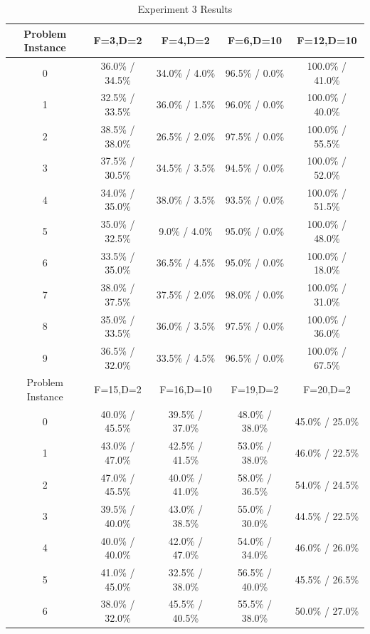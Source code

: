 \documentclass[times,12pt,titlepage]{mstogs}
\begin{document}
\begin{ThesisBody}
\FloatBarrier
\begin{table}[htbp]
	\centering
	\caption{Experiment 3 Results}
	\label{tab:experiment3Results}
	\begin{tabular}{c|c|c|c|c}
		\toprule
		Problem Instance & F=3,D=2 & F=4,D=2 & F=6,D=10 & F=12,D=10\\
		\hline
		0 & 36.0\% / 34.5\% & 34.0\% / 4.0\% & 96.5\% / 0.0\% & 100.0\% / 41.0\%\\
		\hline
		1 & 32.5\% / 33.5\% & 36.0\% / 1.5\% & 96.0\% / 0.0\% & 100.0\% / 40.0\%\\
		\hline
		2 & 38.5\% / 38.0\% & 26.5\% / 2.0\% & 97.5\% / 0.0\% & 100.0\% / 55.5\%\\
		\hline
		3 & 37.5\% / 30.5\% & 34.5\% / 3.5\% & 94.5\% / 0.0\% & 100.0\% / 52.0\%\\
		\hline
		4 & 34.0\% / 35.0\% & 38.0\% / 3.5\% & 93.5\% / 0.0\% & 100.0\% / 51.5\%\\
		\hline
		5 & 35.0\% / 32.5\% & 9.0\% / 4.0\% & 95.0\% / 0.0\% & 100.0\% / 48.0\%\\
		\hline
		6 & 33.5\% / 35.0\% & 36.5\% / 4.5\% & 95.0\% / 0.0\% & 100.0\% / 18.0\%\\
		\hline
		7 & 38.0\% / 37.5\% & 37.5\% / 2.0\% & 98.0\% / 0.0\% & 100.0\% / 31.0\%\\
		\hline
		8 & 35.0\% / 33.5\% & 36.0\% / 3.5\% & 97.5\% / 0.0\% & 100.0\% / 36.0\%\\
		\hline
		9 & 36.5\% / 32.0\% & 33.5\% / 4.5\% & 96.5\% / 0.0\% & 100.0\% / 67.5\%\\
		\hline
		\hline
		Problem Instance & F=15,D=2 & F=16,D=10 & F=19,D=2 & F=20,D=2\\
		\hline
		0 & 40.0\% / 45.5\% & 39.5\% / 37.0\% & 48.0\% / 38.0\% & 45.0\% / 25.0\%\\
		\hline
		1 & 43.0\% / 47.0\% & 42.5\% / 41.5\% & 53.0\% / 38.0\% & 46.0\% / 22.5\%\\
		\hline
		2 & 47.0\% / 45.5\% & 40.0\% / 41.0\% & 58.0\% / 36.5\% & 54.0\% / 24.5\%\\
		\hline
		3 & 39.5\% / 40.0\% & 43.0\% / 38.5\% & 55.0\% / 30.0\% & 44.5\% / 22.5\%\\
		\hline
		4 & 40.0\% / 40.0\% & 42.0\% / 47.0\% & 54.0\% / 34.0\% & 46.0\% / 26.0\%\\
		\hline
		5 & 41.0\% / 45.0\% & 32.5\% / 38.0\% & 56.5\% / 40.0\% & 45.5\% / 26.5\%\\
		\hline
		6 & 38.0\% / 32.0\% & 45.5\% / 40.5\% & 55.5\% / 38.0\% & 50.0\% / 27.0\%\\

\end{tabular}
\end{table}
\end{ThesisBody}
\end{document}
